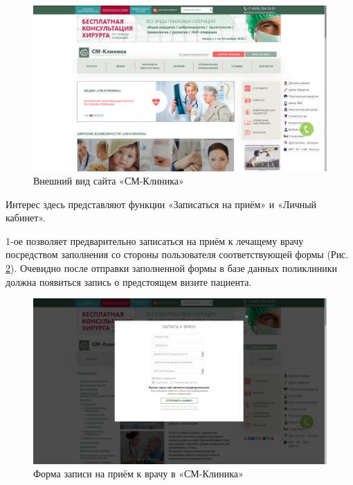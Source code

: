 \documentclass[14pt,a4paper,russian]{extreport}
\begin{document}
\begin{figure}[h!]
        \includegraphics[width=\textwidth]{cmclinic}
        \caption{Внешний вид сайта «СМ-Клиника»}
        \label{fig:cc}
\end{figure}

\noindent Интерес здесь представляют функции «Записаться на приём» и «Личный кабинет». \par
1-ое позволяет предварительно записаться на приём к лечащему врачу посредством заполнения
со стороны пользователя соответствующей формы (Рис. \ref{fig:appdoc}). Очевидно после отправки
заполненной формы в базе данных поликлиники должна появиться запись о предстоящем визите
пациента.

\begin{figure}[t!]
        \includegraphics[width=\textwidth]{appdoc}
        \caption{Форма записи на приём к врачу в «СМ-Клиника»}
        \label{fig:appdoc}
\end{figure}
\end{document}
